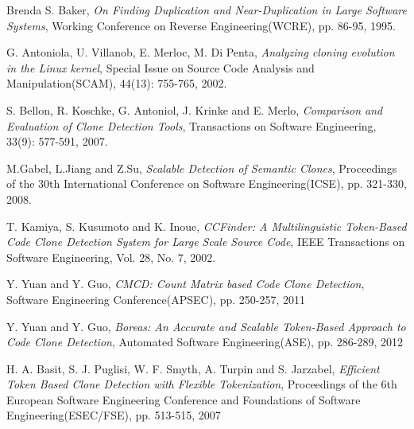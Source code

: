 \documentclass[conference]{IEEEtran}
\begin{document}
\begin{thebibliography}{10}

Brenda S. Baker, \emph{On Finding Duplication and Near-Duplication in Large Software Systems}, Working Conference on Reverse Engineering(WCRE), pp. 86-95, 1995.

G. Antoniola, U. Villanob, E. Merloc, M. Di Penta, \emph{Analyzing cloning evolution in the Linux kernel}, Special Issue on Source Code Analysis and Manipulation(SCAM), 44(13): 755-765, 2002. 

S. Bellon, R. Koschke, G. Antoniol, J. Krinke and E. Merlo, \emph{Comparison and Evaluation of Clone Detection Tools}, Transactions on Software Engineering, 33(9): 577-591, 2007.

M.Gabel, L.Jiang and Z.Su, \emph{Scalable Detection of Semantic Clones}, Proceedings of the 30th International Conference on Software Engineering(ICSE), pp. 321-330, 2008.

T. Kamiya, S. Kusumoto and K. Inoue, \emph{CCFinder: A Multilinguistic Token-Based Code Clone Detection System for Large Scale Source Code}, IEEE Transactions on Software Engineering, Vol. 28, No. 7, 2002.

Y. Yuan and Y. Guo, \emph{CMCD: Count Matrix based Code Clone Detection}, Software Engineering Conference(APSEC), pp. 250-257, 2011

Y. Yuan and Y. Guo, \emph{Boreas: An Accurate and Scalable Token-Based Approach to Code Clone Detection}, Automated Software Engineering(ASE), pp. 286-289, 2012

H. A. Basit, S. J. Puglisi, W. F. Smyth, A. Turpin and S. Jarzabel, \emph{Efficient Token Based Clone Detection with Flexible Tokenization}, Proceedings of the 6th European Software Engineering Conference and Foundations of Software Engineering(ESEC/FSE), pp. 513-515, 2007

\end{thebibliography}
\end{document}
